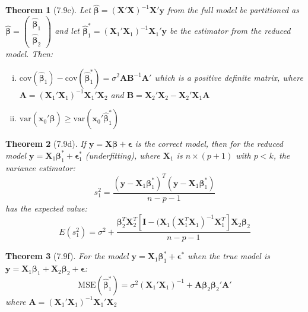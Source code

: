 \documentclass{article}
\newtheorem{theorem}{Theorem}[section]
\begin{document}
\begin{theorem}[7.9c]
Let $\hat{\boldsymbol{\beta}} = (\mathbf{X}'\mathbf{X})^{-1}\mathbf{X}'\mathbf{y}$ from the full model be partitioned as $\hat{\boldsymbol{\beta}} = \begin{pmatrix} \hat{\boldsymbol{\beta}}_1 \\ \hat{\boldsymbol{\beta}}_2 \end{pmatrix}$ and let $\hat{\boldsymbol{\beta}}_1^* = (\mathbf{X}_1'\mathbf{X}_1)^{-1}\mathbf{X}_1'\mathbf{y}$ be the estimator from the reduced model. Then:
\begin{enumerate}[(i)]
\item $\text{cov}(\hat{\boldsymbol{\beta}}_1) - \text{cov}(\hat{\boldsymbol{\beta}}_1^*) = \sigma^2\mathbf{A}\mathbf{B}^{-1}\mathbf{A}'$ which is a positive definite matrix, where $\mathbf{A} = (\mathbf{X}_1'\mathbf{X}_1)^{-1}\mathbf{X}_1'\mathbf{X}_2$ and $\mathbf{B} = \mathbf{X}_2'\mathbf{X}_2 - \mathbf{X}_2'\mathbf{X}_1\mathbf{A}$
\item $\text{var}(\mathbf{x}_0'\hat{\boldsymbol{\beta}}) \geq \text{var}(\mathbf{x}_0'\hat{\boldsymbol{\beta}}_1^*)$
\end{enumerate}
\end{theorem}

\begin{theorem}[7.9d]
If $\mathbf{y} = \mathbf{X}\boldsymbol{\beta} + \boldsymbol{\epsilon}$ is the correct model, then for the reduced model $\mathbf{y} = \mathbf{X}_1\boldsymbol{\beta}_1^* + \boldsymbol{\epsilon}_1^*$ (underfitting), where $\mathbf{X}_1$ is $n \times (p + 1)$ with $p < k$, the variance estimator:
\[s_1^2 = \frac{(\mathbf{y}-\mathbf{X}_1\boldsymbol{\beta}_1^*)^T(\mathbf{y}-\mathbf{X}_1\boldsymbol{\beta}_1^*)}{n-p-1}\]
has the expected value:
\[E(s_1^2) = \sigma^2 + \frac{\boldsymbol{\beta}_2^T\mathbf{X}_2^T[\mathbf{I}-(\mathbf{X}_1(\mathbf{X}_1^T\mathbf{X}_1)^{-1}\mathbf{X}_1^T]\mathbf{X}_2\boldsymbol{\beta}_2}{n-p-1}\]
\end{theorem}

\begin{theorem}[7.9f]
For the model $\mathbf{y} = \mathbf{X}_1\boldsymbol{\beta}_1^* + \boldsymbol{\epsilon}^*$ when the true model is $\mathbf{y} = \mathbf{X}_1\boldsymbol{\beta}_1 + \mathbf{X}_2\boldsymbol{\beta}_2 + \boldsymbol{\epsilon}$:
\[\text{MSE}(\hat{\boldsymbol{\beta}}_1^*) = \sigma^2(\mathbf{X}_1'\mathbf{X}_1)^{-1} + \mathbf{A}\boldsymbol{\beta}_2\boldsymbol{\beta}_2'\mathbf{A}'\]
where $\mathbf{A} = (\mathbf{X}_1'\mathbf{X}_1)^{-1}\mathbf{X}_1'\mathbf{X}_2$
\end{theorem}
\end{document}
